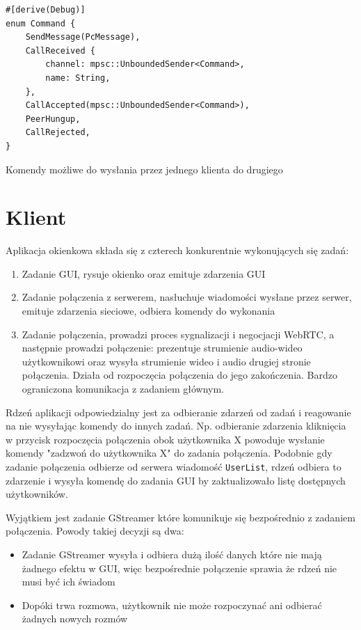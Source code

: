 \begin{listing}[H]
    \begin{verbatim}
#[derive(Debug)]
enum Command {
    SendMessage(PcMessage),
    CallReceived {
        channel: mpsc::UnboundedSender<Command>,
        name: String,
    },
    CallAccepted(mpsc::UnboundedSender<Command>),
    PeerHungup,
    CallRejected,
}
    \end{verbatim}
    \caption{Komendy możliwe do wysłania przez jednego klienta do drugiego}
    \label{lst:server_command}
\end{listing}



\section{Klient}

Aplikacja okienkowa składa się z czterech konkurentnie wykonujących się zadań:

\begin{enumerate}
    \item Zadanie GUI, rysuje okienko oraz emituje zdarzenia GUI
    \item Zadanie połączenia z serwerem, nasłuchuje wiadomości wysłane przez serwer, emituje
          zdarzenia sieciowe, odbiera komendy do wykonania
    \item Zadanie połączenia, prowadzi proces sygnalizacji i negocjacji WebRTC, a następnie prowadzi
          połączenie: prezentuje strumienie audio-wideo użytkownikowi oraz wysyła strumienie wideo i
          audio drugiej stronie połączenia. Działa od rozpoczęcia połączenia do jego zakończenia.
          Bardzo ograniczona komunikacja z zadaniem głównym.
\end{enumerate}

Rdzeń aplikacji odpowiedzialny jest za odbieranie zdarzeń od zadań i reagowanie na nie wysyłając
komendy do innych zadań. Np. odbieranie zdarzenia kliknięcia w przycisk rozpoczęcia połączenia
obok użytkownika X powoduje wysłanie komendy "zadzwoń do użytkownika X" do zadania połączenia.
Podobnie gdy zadanie połączenia odbierze od serwera wiadomość \verb|UserList|, rdzeń odbiera to
zdarzenie i wysyła komendę do zadania GUI by zaktualizowało listę dostępnych użytkowników.

Wyjątkiem jest zadanie GStreamer które komunikuje się bezpośrednio z zadaniem połączenia. Powody
takiej decyzji są dwa:

\begin{itemize}
    \item Zadanie GStreamer wysyła i odbiera dużą ilość danych które nie mają żadnego efektu w GUI,
          więc bezpośrednie połączenie sprawia że rdzeń nie musi być ich świadom
    \item Dopóki trwa rozmowa, użytkownik nie może rozpoczynać ani odbierać żadnych nowych rozmów
\end{itemize}

